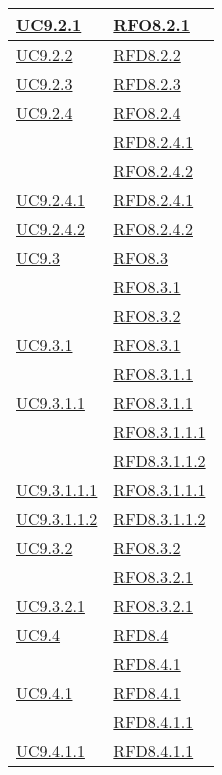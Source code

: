 \begin{longtable}{|>{\centering}m{5cm}|m{5cm}<{\centering}|}
\hyperref[UC9.2.1]{UC9.2.1} & \hyperlink{RFO8.2.1}{RFO8.2.1}\\ \hline
\hyperref[UC9.2.2]{UC9.2.2} & \hyperlink{RFD8.2.2}{RFD8.2.2}\\ \hline
\hyperref[UC9.2.3]{UC9.2.3} & \hyperlink{RFD8.2.3}{RFD8.2.3}\\ \hline
\hyperref[UC9.2.4]{UC9.2.4} & \hyperlink{RFO8.2.4}{RFO8.2.4}\\
& \hyperlink{RFD8.2.4.1}{RFD8.2.4.1}\\
& \hyperlink{RFO8.2.4.2}{RFO8.2.4.2}\\ \hline
\hyperref[UC9.2.4.1]{UC9.2.4.1} & \hyperlink{RFD8.2.4.1}{RFD8.2.4.1}\\ \hline
\hyperref[UC9.2.4.2]{UC9.2.4.2} & \hyperlink{RFO8.2.4.2}{RFO8.2.4.2}\\ \hline
\hyperref[UC9.3]{UC9.3} & \hyperlink{RFO8.3}{RFO8.3}\\
& \hyperlink{RFO8.3.1}{RFO8.3.1}\\
& \hyperlink{RFO8.3.2}{RFO8.3.2}\\ \hline
\hyperref[UC9.3.1]{UC9.3.1} & \hyperlink{RFO8.3.1}{RFO8.3.1}\\
& \hyperlink{RFO8.3.1.1}{RFO8.3.1.1}\\ \hline
\hyperref[UC9.3.1.1]{UC9.3.1.1} & \hyperlink{RFO8.3.1.1}{RFO8.3.1.1}\\
& \hyperlink{RFO8.3.1.1.1}{RFO8.3.1.1.1}\\
& \hyperlink{RFD8.3.1.1.2}{RFD8.3.1.1.2}\\ \hline
\hyperref[UC9.3.1.1.1]{UC9.3.1.1.1} & \hyperlink{RFO8.3.1.1.1}{RFO8.3.1.1.1}\\ \hline
\hyperref[UC9.3.1.1.2]{UC9.3.1.1.2} & \hyperlink{RFD8.3.1.1.2}{RFD8.3.1.1.2}\\ \hline
\hyperref[UC9.3.2]{UC9.3.2} & \hyperlink{RFO8.3.2}{RFO8.3.2}\\
& \hyperlink{RFO8.3.2.1}{RFO8.3.2.1}\\ \hline
\hyperref[UC9.3.2.1]{UC9.3.2.1} & \hyperlink{RFO8.3.2.1}{RFO8.3.2.1}\\ \hline
\hyperref[UC9.4]{UC9.4} & \hyperlink{RFD8.4}{RFD8.4}\\
& \hyperlink{RFD8.4.1}{RFD8.4.1}\\ \hline
\hyperref[UC9.4.1]{UC9.4.1} & \hyperlink{RFD8.4.1}{RFD8.4.1}\\
& \hyperlink{RFD8.4.1.1}{RFD8.4.1.1}\\ \hline
\hyperref[UC9.4.1.1]{UC9.4.1.1} & \hyperlink{RFD8.4.1.1}{RFD8.4.1.1}\\ \hline

\end{longtable}
